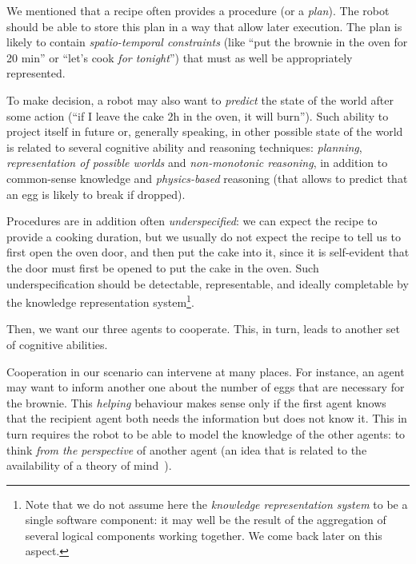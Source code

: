We mentioned that a recipe often provides a procedure (or a \emph{plan}). The
robot should be able to store this plan in a way that allow later execution.
The plan is likely to contain \emph{spatio-temporal constraints} (like ``put
the brownie in the oven for 20 min'' or ``let's cook \emph{for tonight}'') that
must as well be appropriately represented.

To make decision, a robot may also want to \emph{predict} the state of the world
after some action (``if I leave the cake 2h in the oven, it will burn'').
Such ability to project itself in future or, generally speaking, in other
possible state of the world is related to several cognitive ability and
reasoning techniques: \emph{planning}, \emph{representation of possible worlds}
and \emph{non-monotonic reasoning}, in addition to common-sense knowledge and
\emph{physics-based} reasoning (that allows to predict that an egg is likely to
break if dropped).

Procedures are in addition often \emph{underspecified}: we can expect the recipe
to provide a cooking duration, but we usually do not expect the recipe to tell
us to first open the oven door, and then put the cake into it, since it is
self-evident that the door must first be opened to put the cake in the oven.
Such underspecification should be detectable, representable, and ideally
completable by the knowledge representation system\footnote{Note that we do not
assume here the {\it knowledge representation system} to be a single software
component: it may well be the result of the aggregation of several logical
components working together. We come back later on this aspect.}.

Then, we want our three agents to cooperate. This, in turn, leads to another
set of cognitive abilities.

Cooperation in our scenario can intervene at many places. For instance, an
agent may want to inform another one about the number of eggs that are
necessary for the brownie. This \emph{helping} behaviour makes sense only if
the first agent knows that the recipient agent both needs the information but
does not know it. This in turn requires the robot to be able to model the
knowledge of the other agents: to think \emph{from the perspective} of another
agent (an idea that is related to the availability of a theory of
mind~\cite{Leslie2000}).

